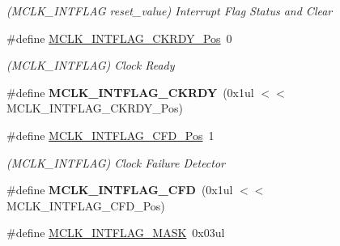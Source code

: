 \begin{DoxyCompactItemize}
\begin{DoxyCompactList}\small\item\em (M\+C\+L\+K\+\_\+\+I\+N\+T\+F\+L\+A\+G reset\+\_\+value) Interrupt Flag Status and Clear \end{DoxyCompactList}\item 
\hypertarget{group___s_a_m_l21___m_c_l_k_gabef328de34a9da476fa9a626643999e5}{}\#define \hyperlink{group___s_a_m_l21___m_c_l_k_gabef328de34a9da476fa9a626643999e5}{M\+C\+L\+K\+\_\+\+I\+N\+T\+F\+L\+A\+G\+\_\+\+C\+K\+R\+D\+Y\+\_\+\+Pos}~0\label{group___s_a_m_l21___m_c_l_k_gabef328de34a9da476fa9a626643999e5}

\begin{DoxyCompactList}\small\item\em (M\+C\+L\+K\+\_\+\+I\+N\+T\+F\+L\+A\+G) Clock Ready \end{DoxyCompactList}\item 
\hypertarget{group___s_a_m_l21___m_c_l_k_ga4d627a8eb324eb7142abf6c035aef208}{}\#define {\bfseries M\+C\+L\+K\+\_\+\+I\+N\+T\+F\+L\+A\+G\+\_\+\+C\+K\+R\+D\+Y}~(0x1ul $<$$<$ M\+C\+L\+K\+\_\+\+I\+N\+T\+F\+L\+A\+G\+\_\+\+C\+K\+R\+D\+Y\+\_\+\+Pos)\label{group___s_a_m_l21___m_c_l_k_ga4d627a8eb324eb7142abf6c035aef208}

\item 
\hypertarget{group___s_a_m_l21___m_c_l_k_ga4b06d212efd9ce783ea96f0abb35c011}{}\#define \hyperlink{group___s_a_m_l21___m_c_l_k_ga4b06d212efd9ce783ea96f0abb35c011}{M\+C\+L\+K\+\_\+\+I\+N\+T\+F\+L\+A\+G\+\_\+\+C\+F\+D\+\_\+\+Pos}~1\label{group___s_a_m_l21___m_c_l_k_ga4b06d212efd9ce783ea96f0abb35c011}

\begin{DoxyCompactList}\small\item\em (M\+C\+L\+K\+\_\+\+I\+N\+T\+F\+L\+A\+G) Clock Failure Detector \end{DoxyCompactList}\item 
\hypertarget{group___s_a_m_l21___m_c_l_k_ga237cf3fd32ee65594472ae55d0f57b7e}{}\#define {\bfseries M\+C\+L\+K\+\_\+\+I\+N\+T\+F\+L\+A\+G\+\_\+\+C\+F\+D}~(0x1ul $<$$<$ M\+C\+L\+K\+\_\+\+I\+N\+T\+F\+L\+A\+G\+\_\+\+C\+F\+D\+\_\+\+Pos)\label{group___s_a_m_l21___m_c_l_k_ga237cf3fd32ee65594472ae55d0f57b7e}

\item 
\hypertarget{group___s_a_m_l21___m_c_l_k_ga4d2f239e68ff5fba4b25397d91bed74a}{}\#define \hyperlink{group___s_a_m_l21___m_c_l_k_ga4d2f239e68ff5fba4b25397d91bed74a}{M\+C\+L\+K\+\_\+\+I\+N\+T\+F\+L\+A\+G\+\_\+\+M\+A\+S\+K}~0x03ul\label{group___s_a_m_l21___m_c_l_k_ga4d2f239e68ff5fba4b25397d91bed74a}


\end{DoxyCompactItemize}
